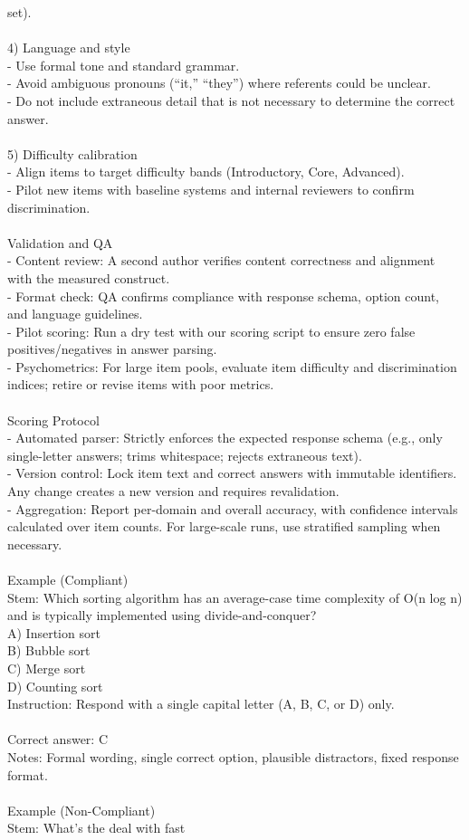 \begin{tcolorbox}
set).\\ \\4) Language and style\\- Use formal tone and standard grammar.\\- Avoid ambiguous pronouns (“it,” “they”) where referents could be unclear.\\- Do not include extraneous detail that is not necessary to determine the correct answer.\\ \\5) Difficulty calibration\\- Align items to target difficulty bands (Introductory, Core, Advanced).\\- Pilot new items with baseline systems and internal reviewers to confirm discrimination.\\ \\Validation and QA\\- Content review: A second author verifies content correctness and alignment with the measured construct.\\- Format check: QA confirms compliance with response schema, option count, and language guidelines.\\- Pilot scoring: Run a dry test with our scoring script to ensure zero false positives/negatives in answer parsing.\\- Psychometrics: For large item pools, evaluate item difficulty and discrimination indices; retire or revise items with poor metrics.\\ \\Scoring Protocol\\- Automated parser: Strictly enforces the expected response schema (e.g., only single-letter answers; trims whitespace; rejects extraneous text).\\- Version control: Lock item text and correct answers with immutable identifiers. Any change creates a new version and requires revalidation.\\- Aggregation: Report per-domain and overall accuracy, with confidence intervals calculated over item counts. For large-scale runs, use stratified sampling when necessary.\\ \\Example (Compliant)\\Stem: Which sorting algorithm has an average-case time complexity of O(n log n) and is typically implemented using divide-and-conquer?\\A) Insertion sort\\B) Bubble sort\\C) Merge sort\\D) Counting sort\\Instruction: Respond with a single capital letter (A, B, C, or D) only.\\ \\Correct answer: C\\Notes: Formal wording, single correct option, plausible distractors, fixed response format.\\ \\Example (Non-Compliant)\\Stem: What’s the deal with fast 
\end{tcolorbox}
